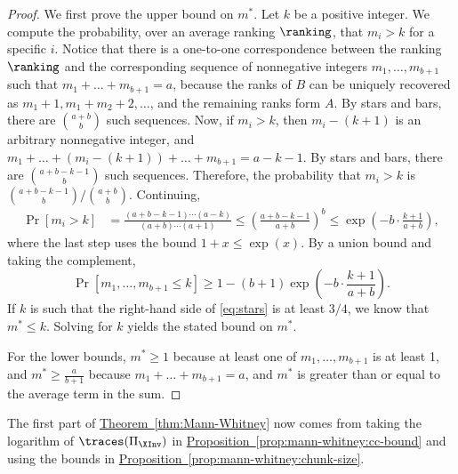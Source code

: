 \documentclass[11pt]{article}
\numberwithin{equation}{section}
\theoremstyle{definition}
\theoremstyle{plain}
\newcommand{\expref}[2]{\hyperref[#2]{#1~\ref{#2}}}
\begin{document}
\begin{proof}
We first prove the upper bound on $m^*$. Let $k$ be a positive integer. We compute the probability, over an average ranking $\ranking$, that $m_i> k$ for a specific $i$. 
Notice that there is a one-to-one correspondence between the ranking $\ranking$ and the corresponding sequence of nonnegative integers $m_1,\dots,m_{b+1}$ such that $m_1+\dots+m_{b+1}=a$, because the ranks of $B$ can be uniquely recovered as $m_1+1,m_1+m_2+2,\dots$, and the remaining ranks form $A$. By stars and bars, there are $\binom{a+b}{b}$ such sequences. Now, if $m_i>k$, then $m_i-(k+1)$ is an arbitrary nonnegative integer, and $m_1+\dots+(m_i-(k+1))+\dots+m_{b+1}=a-k-1$. By stars and bars, there are $\binom{a+b-k-1}{b}$ such sequences. Therefore, the probability that $m_i>k$ is $\binom{a+b-k-1}{b}/\binom{a+b}{b}$. Continuing,
\begin{align*}
\Pr[m_i> k]&=\frac{(a+b-k-1)\cdots (a-k)}{(a+b)\cdots (a+1)}
        \le \left(\frac{a+b-k-1}{a+b}\right)^b
        \le \exp\left(-b\cdot \frac{k+1}{a+b} \right),
\end{align*}
where the last step uses the bound $1+x \le \exp(x)$.
By a union bound and taking the complement,
    \begin{equation}\label{eq:stars}
        \Pr[m_1,\dots,m_{b+1}\le k] \ge 1-(b+1)\exp\left(-b\cdot \frac{k+1}{a+b} \right).
    \end{equation}
If $k$ is such that the right-hand side of \eqref{eq:stars} is at least $3/4$, we know that $m^* \le k$. Solving for $k$ yields the stated bound on $m^*$.
    
For the lower bounds, $m^*\ge 1$ because at least one of $m_1,\dots,m_{b+1}$ is at least 1, and $m^*\ge \frac{a}{b+1}$ because $m_1+\dots+m_{b+1}=a$, and $m^*$ is greater than or equal to the average term in the sum.
\end{proof}

The first part of \expref{Theorem}{thm:Mann-Whitney} now comes from taking the logarithm of $\traces(\Pi_{\XInv})$ in \expref{Proposition}{prop:mann-whitney:cc-bound} and using the bounds in \expref{Proposition}{prop:mann-whitney:chunk-size}.
\end{document}
